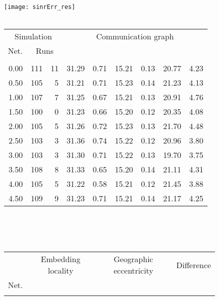 \documentclass{article}
\begin{document}
\begin{figure}[h]
\begin{center}
\texttt{[image: sinrErr\_res]}
~\\~\\
\begin{tabular}{|r|rr|rr|rr|rr|}
\hline
\multicolumn{3}{|c|}{Simulation} & \multicolumn{6}{|c|}{Communication graph}\\
\multicolumn{1}{|c}{Net.} & \multicolumn{2}{c|}{Runs} & \multicolumn{2}{|c}{} & \multicolumn{2}{c}{} & \multicolumn{2}{c|}{}\\
\hline
\multicolumn{1}{|c|}{} & \multicolumn{1}{|c}{} & \multicolumn{1}{c|}{} & \multicolumn{1}{|c}{} & \multicolumn{1}{c|}{} & \multicolumn{1}{|c}{} & \multicolumn{1}{c|}{} & \multicolumn{1}{|c}{} & \multicolumn{1}{c|}{}\\
0.00 & 111 & 11 & 31.29 & 0.71 & 15.21 & 0.13 & 20.77 & 4.23\\
0.50 & 105 &  5 & 31.21 & 0.71 & 15.23 & 0.14 & 21.23 & 4.13\\
1.00 & 107 &  7 & 31.25 & 0.67 & 15.21 & 0.13 & 20.91 & 4.76\\
1.50 & 100 &  0 & 31.23 & 0.66 & 15.20 & 0.12 & 20.35 & 4.08\\
2.00 & 105 &  5 & 31.26 & 0.72 & 15.23 & 0.13 & 21.70 & 4.48\\
2.50 & 103 &  3 & 31.36 & 0.74 & 15.22 & 0.12 & 20.96 & 3.80\\
3.00 & 103 &  3 & 31.30 & 0.71 & 15.22 & 0.13 & 19.70 & 3.75\\
3.50 & 108 &  8 & 31.33 & 0.65 & 15.20 & 0.14 & 21.11 & 4.31\\
4.00 & 105 &  5 & 31.22 & 0.58 & 15.21 & 0.12 & 21.45 & 3.88\\
4.50 & 109 &  9 & 31.23 & 0.71 & 15.21 & 0.14 & 21.17 & 4.25\\
\hline
\end{tabular}\\
~\\~\\
\begin{tabular}{|r|rr|rr|rr|rr|rr|}
\hline
& \multicolumn{4}{|c|}{Embedding locality} & \multicolumn{4}{|c|}{Geographic eccentricity} & \multicolumn{2}{|c|}{Difference}\\
Net. & \multicolumn{2}{c}{} & \multicolumn{2}{c|}{} & \multicolumn{2}{c}{} & \multicolumn{2}{c|}{}&  & \\
\hline
\multicolumn{1}{|c|}{} & \multicolumn{1}{|c}{} & \multicolumn{1}{c|}{} & \multicolumn{1}{|c}{} & \multicolumn{1}{c|}{} & \multicolumn{1}{|c}{} & \multicolumn{1}{c|}{} & \multicolumn{1}{|c}{} & \multicolumn{1}{c|}{} & \multicolumn{1}{|c}{} & \multicolumn{1}{c|}{}\\

\end{tabular}
\end{center}
\end{figure}
\end{document}
